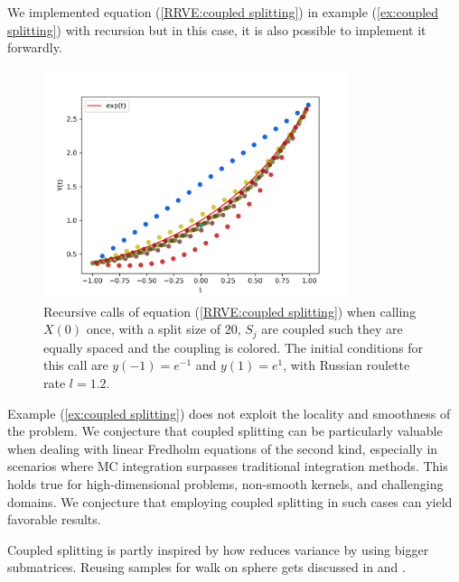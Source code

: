 \documentclass[a4paper,12pt]{article}
\begin{document}
\begin{pythonn} \label{py:coupled splitting}
    We implemented equation (\ref{RRVE:coupled splitting}) in example
    (\ref{ex:coupled splitting}) with recursion but in this case, it
    is also possible to implement it forwardly. \\

    \begin{figure}[h!]
        \centering
        \includegraphics[width=0.8\textwidth]{plots/coupled split.png}
        \caption{Recursive calls of equation (\ref{RRVE:coupled splitting}) when
        calling $X(0)$ once,
        with a split size of $20$, $S_{j}$ are coupled such
        they are equally spaced and the coupling is colored.
        The initial conditions for this call are $y(-1)=e^{-1}$ and $y(1)=e^{1}$,
        with Russian roulette rate $l=1.2$.  }
        \label{fig:coupled splitting}
    \end{figure}
\end{pythonn}


Example (\ref{ex:coupled splitting}) does not
exploit the locality and smoothness of the problem.
We conjecture that coupled splitting can be particularly valuable when
dealing with linear Fredholm equations of the second kind,
especially in scenarios where MC integration surpasses
traditional integration methods. This holds true for
high-dimensional problems, non-smooth kernels, and
challenging domains. We conjecture that employing
coupled splitting in such cases can yield favorable results.

\begin{related}
    Coupled splitting is partly inspired by how \cite{sabelfeld_sparsified_2009}
    reduces variance by using bigger submatrices.
    Reusing samples for walk on sphere gets discussed
    in \cite{miller_boundary_2023} and \cite{bakbouk_mean_2023}.
\end{related}
\end{document}
